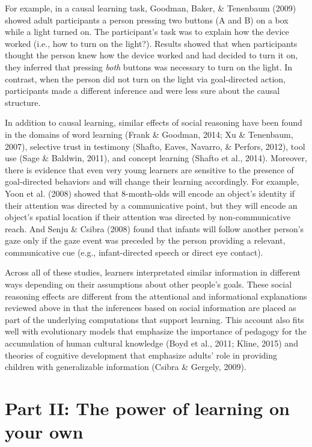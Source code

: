 \documentclass[a4paper,man,apacite,floatsintext]{apa6}
\begin{document}
For example, in a causal learning task, Goodman, Baker, \& Tenenbaum
(2009) showed adult participants a person pressing two buttons (A and B)
on a box while a light turned on. The participant's task was to explain
how the device worked (i.e., how to turn on the light?). Results showed
that when participants thought the person knew how the device worked and
had decided to turn it on, they inferred that pressing \emph{both}
buttons was necessary to turn on the light. In contrast, when the person
did not turn on the light via goal-directed action, participants made a
different inference and were less sure about the causal structure.

In addition to causal learning, similar effects of social reasoning have
been found in the domains of word learning (Frank \& Goodman, 2014; Xu
\& Tenenbaum, 2007), selective trust in testimony (Shafto, Eaves,
Navarro, \& Perfors, 2012), tool use (Sage \& Baldwin, 2011), and
concept learning (Shafto et al., 2014). Moreover, there is evidence that
even very young learners are sensitive to the presence of goal-directed
behaviors and will change their learning accordingly. For example, Yoon
et al. (2008) showed that 8-month-olds will encode an object's identity
if their attention was directed by a communicative point, but they will
encode an object's spatial location if their attention was directed by
non-communicative reach. And Senju \& Csibra (2008) found that infants
will follow another person's gaze only if the gaze event was preceded by
the person providing a relevant, communicative cue (e.g.,
infant-directed speech or direct eye contact).

Across all of these studies, learners interpretated similar information
in different ways depending on their assumptions about other people's
goals. These social reasoning effects are different from the attentional
and informational explanations reviewed above in that the inferences
based on social information are placed as part of the underlying
computations that support learning. This account also fits well with
evolutionary models that emphasize the importance of pedagogy for the
accumulation of human cultural knowledge (Boyd et al., 2011; Kline,
2015) and theories of cognitive development that emphasize adults' role
in providing children with generalizable information (Csibra \& Gergely,
2009).

\section{Part II: The power of learning on your
own}\label{part-ii-the-power-of-learning-on-your-own}
\end{document}

